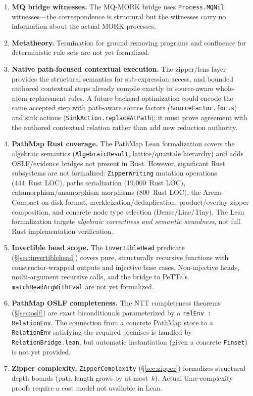 \documentclass[11pt]{article}
\theoremstyle{definition}
\theoremstyle{remark}
\newcommand{\MORK}{\textup{MORK}}
\newcommand{\PathMap}{\textup{PathMap}}
\begin{document}
\begin{enumerate}
  \item \textbf{MQ bridge witnesses.}
    The MQ-MORK bridge uses \texttt{Process.MQNil} witnesses---the
    correspondence is structural but the witnesses carry no information
    about the actual \MORK{} processes.

  \item \textbf{Metatheory.}
    Termination for ground removing programs and confluence for
    deterministic rule sets are not yet formalized.

  \item \textbf{Native path-focused contextual execution.}
    \label{sec:future}
    The zipper/lens layer provides the structural semantics for
    sub-expression access, and bounded authored contextual steps already
    compile exactly to source-aware whole-atom replacement rules.  A future
    backend optimization could encode the same accepted step with path-aware
    source factors (\texttt{SourceFactor.focus}) and sink actions
    (\texttt{SinkAction.replaceAtPath}); it must prove agreement with the
    authored contextual relation rather than add new reduction authority.

  \item \textbf{PathMap Rust coverage.}
    The \PathMap{} Lean formalization covers the algebraic semantics
    (\texttt{AlgebraicResult}, lattice/quantale hierarchy) and adds
    OSLF/evidence bridges not present in Rust.
    However, significant Rust subsystems are not formalized:
    \texttt{ZipperWriting} mutation operations (444~Rust LOC),
    paths serialization (19{,}000~Rust LOC),
    catamorphism/anamorphism morphisms (800~Rust LOC),
    the Arena-Compact on-disk format,
    merkleization/deduplication,
    product/overlay zipper composition,
    and concrete node type selection (Dense/Line/Tiny).
    The Lean formalization targets \emph{algebraic correctness and
    semantic soundness}, not full Rust implementation verification.

  \item \textbf{Invertible head scope.}
    The \texttt{InvertibleHead} predicate
    (\S\ref{sec:invertiblehead}) covers pure, structurally recursive
    functions with constructor-wrapped outputs and injective
    base cases.  Non-injective heads, multi-argument recursive calls,
    and the bridge to PeTTa's \texttt{matchHeadArgWithEval} are not
    yet formalized.

  \item \textbf{PathMap OSLF completeness.}
    The NTT completeness theorems (\S\ref{sec:oslf}) are exact
    biconditionals parameterized by a \texttt{relEnv : RelationEnv}.
    The connection from a concrete \PathMap{} store to a
    \texttt{RelationEnv} satisfying the required premises is handled by
    \texttt{RelationBridge.lean}, but automatic instantiation (given a
    concrete \texttt{Finset}) is not yet provided.

  \item \textbf{Zipper complexity.}
    \texttt{ZipperComplexity} (\S\ref{sec:zipper}) formalizes
    structural depth bounds (path length grows by at most~$k$).
    Actual time-complexity proofs require a cost model not available
    in Lean.
\end{enumerate}
\end{document}
